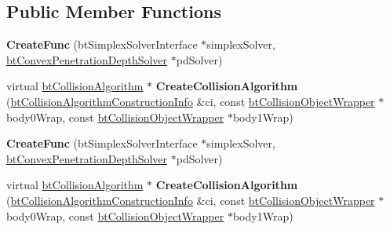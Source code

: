 \subsection*{Public Member Functions}
\begin{DoxyCompactItemize}
\item 
\mbox{\label{structbtConvexConvexAlgorithm_1_1CreateFunc_af47e5750bd8ef904b04fe59a55cb3c71}} 
{\bfseries Create\+Func} (bt\+Simplex\+Solver\+Interface $\ast$simplex\+Solver, \hyperlink{classbtConvexPenetrationDepthSolver}{bt\+Convex\+Penetration\+Depth\+Solver} $\ast$pd\+Solver)
\item 
\mbox{\label{structbtConvexConvexAlgorithm_1_1CreateFunc_a57dfa6b4924a2314ed9d72e732dde22c}} 
virtual \hyperlink{classbtCollisionAlgorithm}{bt\+Collision\+Algorithm} $\ast$ {\bfseries Create\+Collision\+Algorithm} (\hyperlink{structbtCollisionAlgorithmConstructionInfo}{bt\+Collision\+Algorithm\+Construction\+Info} \&ci, const \hyperlink{structbtCollisionObjectWrapper}{bt\+Collision\+Object\+Wrapper} $\ast$body0\+Wrap, const \hyperlink{structbtCollisionObjectWrapper}{bt\+Collision\+Object\+Wrapper} $\ast$body1\+Wrap)
\item 
\mbox{\label{structbtConvexConvexAlgorithm_1_1CreateFunc_af47e5750bd8ef904b04fe59a55cb3c71}} 
{\bfseries Create\+Func} (bt\+Simplex\+Solver\+Interface $\ast$simplex\+Solver, \hyperlink{classbtConvexPenetrationDepthSolver}{bt\+Convex\+Penetration\+Depth\+Solver} $\ast$pd\+Solver)
\item 
\mbox{\label{structbtConvexConvexAlgorithm_1_1CreateFunc_a57dfa6b4924a2314ed9d72e732dde22c}} 
virtual \hyperlink{classbtCollisionAlgorithm}{bt\+Collision\+Algorithm} $\ast$ {\bfseries Create\+Collision\+Algorithm} (\hyperlink{structbtCollisionAlgorithmConstructionInfo}{bt\+Collision\+Algorithm\+Construction\+Info} \&ci, const \hyperlink{structbtCollisionObjectWrapper}{bt\+Collision\+Object\+Wrapper} $\ast$body0\+Wrap, const \hyperlink{structbtCollisionObjectWrapper}{bt\+Collision\+Object\+Wrapper} $\ast$body1\+Wrap)
\end{DoxyCompactItemize}
